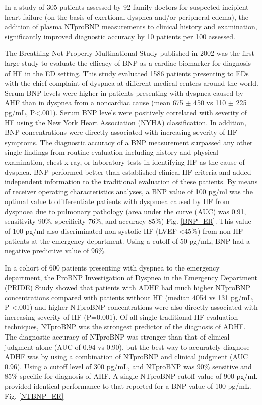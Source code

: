 \documentclass[14pt,a4paper,onecolumn]{extarticle}
\begin{document}
In a study of 305 patients assessed by 92 family doctors for suspected incipient heart failure (on the basis of exertional dyspnea and/or peripheral edema), the addition of plasma NTproBNP measurements to clinical history and examination, significantly improved diagnostic accuracy by 10 patients per 100 assessed. \citep{bib3133}

The Breathing Not Properly Multinational Study published in 2002 was the first large study to evaluate the efficacy of BNP as a cardiac biomarker for diagnosis of HF in the ED setting. This study evaluated 1586 patients presenting to EDs with the chief complaint of dyspnea at different medical centers around the world. Serum BNP levels were higher in patients presenting with dyspnea caused by AHF than in dyspnea from a noncardiac cause (mean 675  $\pm$ 450 vs 110  $\pm$ 225 pg/mL, P<.001). Serum BNP levels were positively correlated with severity of HF using the New York Heart Association (NYHA) classification. In addition, BNP concentrations were directly associated with increasing severity of HF symptoms. The diagnostic accuracy of a BNP measurement surpassed any other single findings from routine evaluation including history and physical examination, chest x-ray, or laboratory tests in identifying HF as the cause of dyspnea.  BNP performed better than established clinical HF criteria
and added independent information to the traditional evaluation of these patients.  By means of receiver operating characteristics analyses, a BNP value of 100 pg/ml was the optimal value to differentiate patients with dyspnoea caused by HF from dyspnoea due to pulmonary pathology (area under the curve (AUC) was 0.91, sensitivity 90\%, specificity 76\%, and accuracy 85\%) Fig. \ref{BNP_ER}.  This value of 100 pg/ml also discriminated non-systolic HF (LVEF <45\%) from non-HF patients at the emergency department. Using a cutoff of 50 pg/mL, BNP had a negative predictive value of 96\%. \citep{Maisel2002}

In a cohort of 600 patients presenting with dyspnea to the emergency department, the ProBNP Investigation of Dyspnea in the Emergency Department (PRIDE) Study showed that patients with ADHF had much higher NTproBNP concentrations compared with patients without HF (median 4054 vs 131 pg/mL, P <.001) and higher NTproBNP concentrations were also directly associated with increasing severity of HF (P=0.001). Of all single traditional HF evaluation techniques, NTproBNP was the strongest predictor of the diagnosis of ADHF. The diagnostic accuracy of NTproBNP was stronger than that of clinical judgment alone (AUC of 0.94 vs 0.90), but the best way to accurately diagnose ADHF was by using a combination of NTproBNP and clinical judgment (AUC 0.96). Using a cutoff level of 300 pg/mL, and NTproBNP was 90\% sensitive and 85\% specific for diagnosis of AHF. A single NTproBNP cutoff value of 900 pg/mL provided identical performance to that reported for a BNP value of 100 pg/mL. Fig. \ref{NTBNP_ER} \citep{Januzzi2005}
\end{document}
